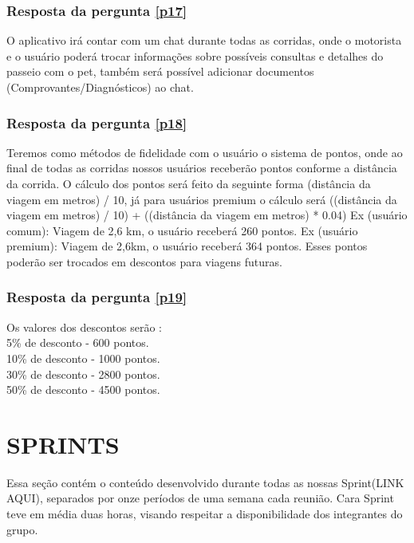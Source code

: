 \begin{apendicesenv}
\subsection{Resposta da pergunta \ref{p17}}
O aplicativo irá contar com um chat durante todas as corridas, onde o motorista e o usuário poderá trocar informações sobre possíveis consultas e detalhes do passeio com o pet, também será possível adicionar documentos (Comprovantes/Diagnósticos) ao chat.

\subsection{Resposta da pergunta \ref{p18}}
Teremos como métodos de fidelidade com o usuário o sistema de pontos, onde ao final de todas as corridas nossos usuários receberão pontos conforme a distância da corrida. O cálculo dos pontos será feito da seguinte forma (distância da viagem em metros) / 10, já para usuários premium o cálculo será ((distância da viagem em metros) / 10) + ((distância da viagem em metros) * 0.04) 
Ex (usuário comum): Viagem de 2,6 km, o usuário receberá 260 pontos.
Ex (usuário premium): Viagem de 2,6km, o usuário receberá 364 pontos.
Esses pontos poderão ser trocados em descontos para viagens futuras.

\subsection{Resposta da pergunta \ref{p19}}
Os valores dos descontos serão :\\
5\% de desconto - 600 pontos.\\
10\% de desconto - 1000 pontos.\\
30\% de desconto - 2800 pontos.\\
50\% de desconto - 4500 pontos.

\chapter{SPRINTS}
Essa seção contém o conteúdo desenvolvido durante todas as nossas Sprint(LINK AQUI), separados por onze períodos de uma semana cada reunião. Cara Sprint teve em média duas horas, visando respeitar a disponibilidade dos integrantes do grupo.\\


\end{apendicesenv}

